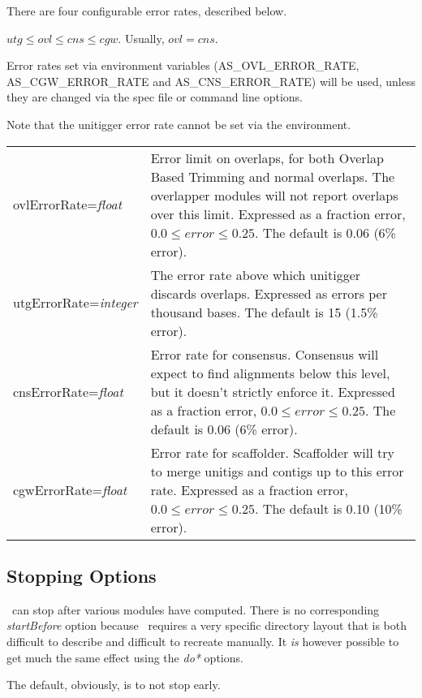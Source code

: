 \documentclass[twoside,11pt]{article}
\begin{document}
There are four configurable error rates, described below.

$utg \le ovl \le cns \le cgw$.  Usually, $ovl = cns$.

Error rates set via environment variables (AS\_OVL\_ERROR\_RATE,
AS\_CGW\_ERROR\_RATE and AS\_CNS\_ERROR\_RATE) will be used, unless they are
changed via the spec file or command line options.

Note that the unitigger error rate cannot be set via the environment.

\begin{longtable}{lp{3.0in}}

ovlErrorRate={\it float} &
Error limit on overlaps, for both Overlap Based Trimming and normal
overlaps.  The overlapper modules will not report overlaps over this
limit.
Expressed as a fraction error, $0.0 \le error \le 0.25$.
The default is 0.06 (6\% error).
\\

utgErrorRate={\it integer} &
The error rate above which unitigger discards overlaps.
Expressed as errors per thousand bases.
The default is 15 (1.5\% error).
\\

cnsErrorRate={\it float} &
Error rate for consensus.  Consensus will expect to find alignments
below this level, but it doesn't strictly enforce it.
Expressed as a fraction error, $0.0 \le error \le 0.25$.
The default is 0.06 (6\% error).
\\

cgwErrorRate={\it float} &
Error rate for scaffolder.  Scaffolder will try to merge unitigs and
contigs up to this error rate.
Expressed as a fraction error, $0.0 \le error \le 0.25$.
The default is 0.10 (10\% error).
\\

\end{longtable}


\subsection{Stopping Options}
\label{sec:stopopts}

\runCA\ can stop after various modules have computed.  There is no
corresponding {\it startBefore} option because \runCA\ requires a very
specific directory layout that is both difficult to describe and
difficult to recreate manually.  It {\em is} however possible to get
much the same effect using the {\it do*} options.

The default, obviously, is to not stop early.
\end{document}
